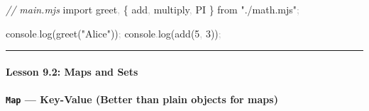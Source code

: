 \documentclass[
  justified,
  openright,
]{tufte-book}
\let\subsection\paragraph
\let\paragraph\paragraph
\newcommand{\StringTok}[1]{\textcolor{CodeString}{#1}}              %
\newcommand{\CommentTok}[1]{\textcolor{CodeComment}{\textit{#1}}}  %
\newcommand{\CodeNumTok}[1]{\textcolor{CodeNumber}{#1}}             %
\newcommand{\CodeFuncTok}[1]{\textcolor{CodeKeyword}{#1}}           %
\newcommand{\CodeAccentTok}[1]{\textcolor{CodeAccent}{#1}}          %
\newcommand{\OperatorTok}[1]{\textcolor{DarkGray}{#1}}              %
\newenvironment{Shaded}{%
  \begin{mdframed}[style=TufteCode]%
}{%
  \end{mdframed}%
}
\let\subsection\paragraph
\let\paragraph\paragraph
\begin{document}
\begin{Shaded}
\begin{Highlighting}[]
\CommentTok{// main.mjs}
\CodeAccentTok{import} greet\OperatorTok{,} \{ add\OperatorTok{,} multiply\OperatorTok{,} \CodeNumTok{PI} \} \CodeAccentTok{from} \StringTok{"./math.mjs"}\OperatorTok{;}
 
console\OperatorTok{.}\CodeFuncTok{log}(\CodeFuncTok{greet}(\StringTok{"Alice"}))\OperatorTok{;}
console\OperatorTok{.}\CodeFuncTok{log}(\CodeFuncTok{add}(\CodeNumTok{5}\OperatorTok{,} \CodeNumTok{3}))\OperatorTok{;}
\end{Highlighting}
\end{Shaded}

\begin{center}\rule{0.5\linewidth}{0.5pt}\end{center}

\subsection{Lesson 9.2: Maps and Sets}\label{lesson-9.2-maps-and-sets}

\subsection{\texorpdfstring{\texttt{Map} --- Key-Value (Better than
plain objects for
maps)}{Map --- Key-Value (Better than plain objects for maps)}}\label{map-key-value-better-than-plain-objects-for-maps}
\end{document}
